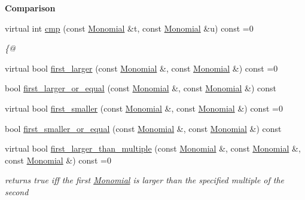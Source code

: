 \begin{Indent}\textbf{ Comparison}\par
\begin{DoxyCompactItemize}
\item 
virtual int \hyperlink{group__orderinggroup_a9bc3155fc98b4d40c26118fa2114b827}{cmp} (const \hyperlink{group__polygroup_class_monomial}{Monomial} \&t, const \hyperlink{group__polygroup_class_monomial}{Monomial} \&u) const =0
\begin{DoxyCompactList}\small\item\em \{@ \end{DoxyCompactList}\item 
virtual bool \hyperlink{group__orderinggroup_aed41fe82e1ca5cd287a93d287fee7c20}{first\+\_\+larger} (const \hyperlink{group__polygroup_class_monomial}{Monomial} \&, const \hyperlink{group__polygroup_class_monomial}{Monomial} \&) const =0
\item 
bool \hyperlink{group__orderinggroup_afbae8e00a02ce0334bb0376cf0f0db75}{first\+\_\+larger\+\_\+or\+\_\+equal} (const \hyperlink{group__polygroup_class_monomial}{Monomial} \&, const \hyperlink{group__polygroup_class_monomial}{Monomial} \&) const
\item 
virtual bool \hyperlink{group__orderinggroup_ab6c02638f87382f7a9a95b994e9a5dfb}{first\+\_\+smaller} (const \hyperlink{group__polygroup_class_monomial}{Monomial} \&, const \hyperlink{group__polygroup_class_monomial}{Monomial} \&) const =0
\item 
bool \hyperlink{group__orderinggroup_ac9234fccc26cca2aee57e28af7b61880}{first\+\_\+smaller\+\_\+or\+\_\+equal} (const \hyperlink{group__polygroup_class_monomial}{Monomial} \&, const \hyperlink{group__polygroup_class_monomial}{Monomial} \&) const
\item 
\mbox{\label{group__orderinggroup_aacb0439b908d45cc5f2635567c6633fd}} 
virtual bool \hyperlink{group__orderinggroup_aacb0439b908d45cc5f2635567c6633fd}{first\+\_\+larger\+\_\+than\+\_\+multiple} (const \hyperlink{group__polygroup_class_monomial}{Monomial} \&, const \hyperlink{group__polygroup_class_monomial}{Monomial} \&, const \hyperlink{group__polygroup_class_monomial}{Monomial} \&) const =0
\begin{DoxyCompactList}\small\item\em returns {\ttfamily true} iff the first \hyperlink{group__polygroup_class_monomial}{Monomial} is larger than the specified multiple of the second \end{DoxyCompactList}\item 

\end{DoxyCompactItemize}
\end{Indent}
